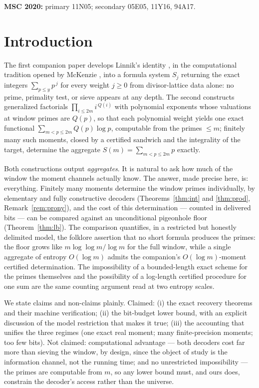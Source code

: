 \documentclass[11pt]{article}
\theoremstyle{remark}
\begin{document}
\smallskip
\noindent\textbf{MSC 2020:} primary 11N05; secondary 05E05, 11Y16, 94A17.

\section{Introduction}

The first companion paper \cite{CompanionI} develops Linnik's identity \cite{Linnik}, in the
computational tradition opened by McKenzie \cite{McKenzie}, into a formula system $S_j$ returning the
exact integers $\sum_{p \le y} p^{\,j}$ for every weight $j \ge 0$ from divisor-lattice data alone: no
prime, primality test, or sieve appears at any depth. The second \cite{CompanionII} constructs
generalized factorials $\prod_{i \le 2m} i^{\,Q(i)}$ with polynomial exponents whose valuations at
window primes are $Q(p)$, so that each polynomial weight yields one exact functional
$\sum_{m < p \le 2m} Q(p) \log p$, computable from the primes $\le m$; finitely many such moments,
closed by a certified sandwich and the integrality of the target, determine the aggregate
$S(m) = \sum_{m < p \le 2m} p$ exactly.

Both constructions output \emph{aggregates}. It is natural to ask how much of the window the moment
channels actually know. The answer, made precise here, is: everything. Finitely many moments determine
the window primes individually, by elementary and fully constructive decoders (Theorems~\ref{thm:int}
and \ref{thm:prod}, Remark~\ref{rem:prony}), and the cost of this determination --- counted in
delivered bits --- can be compared against an unconditional pigeonhole floor
(Theorem~\ref{thm:lb}). The comparison quantifies, in a restricted but honestly delimited model, the
folklore assertion that no short formula produces the primes: the floor grows like
$m \log\log m / \log m$ for the full window, while a single aggregate of entropy $O(\log m)$ admits the
companion's $O(\log m)$-moment certified determination. The impossibility of a bounded-length exact
scheme for the primes themselves and the possibility of a log-length certified procedure for one sum
are the same counting argument read at two entropy scales.

We state claims and non-claims plainly. Claimed: (i) the exact recovery theorems and their machine
verification; (ii) the bit-budget lower bound, with an explicit discussion of the model restriction
that makes it true; (iii) the accounting that unifies the three regimes (one exact real moment; many
finite-precision moments; too few bits). Not claimed: computational advantage --- both decoders cost
far more than sieving the window, by design, since the object of study is the information channel, not
the running time; and no unrestricted impossibility --- the primes are computable from $m$, so any
lower bound must, and ours does, constrain the decoder's access rather than the universe.
\end{document}
